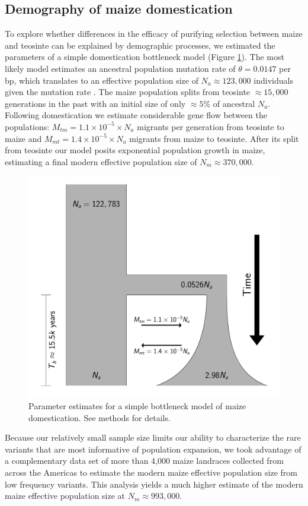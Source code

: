 \documentclass{pnastwo}
\begin{document}
\begin{article}
\subsection{Demography of maize domestication}
To explore whether differences in the efficacy of purifying selection between maize and teosinte can be explained by demographic processes, we estimated the parameters of a simple domestication bottleneck model  (Figure \ref{fig:bottleneck}). 
The most likely model estimates an ancestral population mutation rate of $\theta=0.0147$ per bp, which translates to an effective population size of $N_a \approx 123,000$ individuals given the mutation rate \cite{clark2005}.
The maize population splits from teosinte $\approx 15,000$ generations in the past with an initial size of only $\approx 5\% $ of ancestral $N_a$. 
Following domestication we estimate considerable gene flow between the populations: $M_{tm} =  1.1 \times 10^{-5} \times N_a $  migrants per generation from teosinte to maize and $M_{mt} =  1.4 \times 10^{-5} \times N_a$ migrants from maize to teosinte. 
After its split from teosinte our model posits exponential population growth in maize, estimating a final modern effective population size of $N_m \approx 370,000$.

\begin{figure}
\centering
\includegraphics[width=.4\textwidth]{FigsAndFiles/DomesticationModel/domesticationModel.pdf}
\caption{Parameter estimates for a simple bottleneck model of maize domestication. See methods for details. \label{fig:bottleneck} }
\end{figure}

Because our relatively small sample size limits our ability to characterize the rare variants that are most informative of population expansion, we took advantage of a complementary data set of more than 4,000 maize landraces collected from across the Americas \cite{Hearne2015} to estimate the modern maize effective population size from low frequency variants. 
This analysis yields a much higher estimate of the modern maize effective population size at  $N_m \approx 993,000$.


\end{article}
\end{document}
